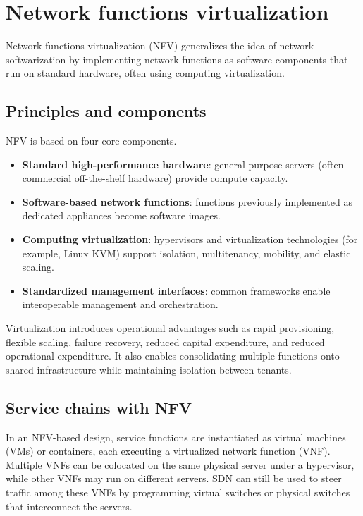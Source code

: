 \documentclass[11pt,a4paper,openany]{report}
\begin{document}
\section{Network functions virtualization}

Network functions virtualization (NFV) generalizes the idea of network softwarization by implementing network functions as software components that run on standard hardware, often using computing virtualization.

\subsection{Principles and components}

NFV is based on four core components.

\begin{itemize}
\item \textbf{Standard high-performance hardware}: general-purpose servers (often commercial off-the-shelf hardware) provide compute capacity.
\item \textbf{Software-based network functions}: functions previously implemented as dedicated appliances become software images.
\item \textbf{Computing virtualization}: hypervisors and virtualization technologies (for example, Linux KVM) support isolation, multitenancy, mobility, and elastic scaling.
\item \textbf{Standardized management interfaces}: common frameworks enable interoperable management and orchestration.
\end{itemize}

Virtualization introduces operational advantages such as rapid provisioning, flexible scaling, failure recovery, reduced capital expenditure, and reduced operational expenditure. It also enables consolidating multiple functions onto shared infrastructure while maintaining isolation between tenants.

\subsection{Service chains with NFV}

In an NFV-based design, service functions are instantiated as virtual machines (VMs) or containers, each executing a virtualized network function (VNF). Multiple VNFs can be colocated on the same physical server under a hypervisor, while other VNFs may run on different servers. SDN can still be used to steer traffic among these VNFs by programming virtual switches or physical switches that interconnect the servers.
\end{document}
